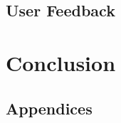 \documentclass{l4proj}
\begin{document}
\section{User Feedback}\label{sec:user-feedback}


\chapter{Conclusion}\label{ch:conclusion}


%
% 

\begin{appendices}

\chapter{Appendices}



\end{appendices}






\end{document}
